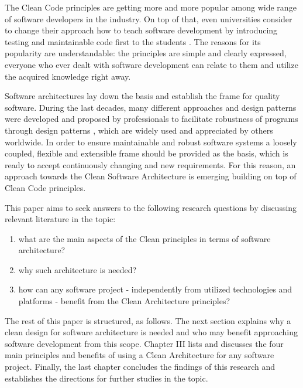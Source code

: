 \documentclass[conference]{IEEEtran}
\begin{document}
The Clean Code principles are getting more and more popular among wide range of software developers in the industry. On top of that, even universities consider to change their approach how to teach software development by introducing testing and maintainable code first to the students \cite{studentscleancode}. The reasons for its popularity are understandable: the principles are simple and clearly expressed, everyone who ever dealt with software development can relate to them and utilize the acquired knowledge right away. 

Software architectures lay down the basis and establish the frame for quality software. During the last decades, many different approaches and design patterns were developed and proposed by professionals to facilitate robustness of programs through design patterns \cite{codecomplete} \cite{onionarchitecture} \cite{gof}, which are widely used and appreciated by others worldwide. In order to ensure maintainable and robust software systems a loosely coupled, flexible and extensible frame should be provided as the basis, which is ready to accept continuously changing and new requirements. For this reason, an approach towards the Clean Software Architecture is emerging \cite{cleanarchitecture} building on top of Clean Code principles. 

This paper aims to seek answers to the following research questions by discussing relevant literature in the topic: 

\begin{enumerate}
	\item what are the main aspects of the Clean principles in terms of software architecture?
	\item why such architecture is needed?
	\item how can any software project - independently from utilized technologies and platforms - benefit from the Clean Architecture principles?
\end{enumerate}  

The rest of this paper is structured, as follows. The next section explains why a clean design for software architecture is needed and who may benefit approaching software development from this scope. Chapter III lists and discusses the four main principles and benefits of using a Clean Architecture for any software project. Finally, the last chapter concludes the findings of this research and establishes the directions for further studies in the topic. 
\end{document}
